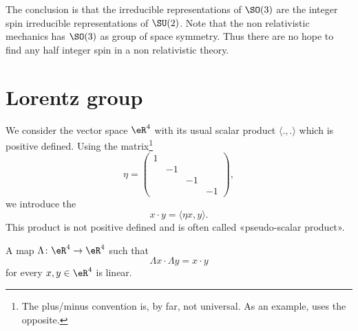 \begin{normaltext}      \label{NORMooHWAYooPlSDOp}
    The conclusion is that the irreducible representations of $\SO(3)$ are the integer spin irreducible representations of $\SU(2)$. Note that the non relativistic mechanics has $\SO(3)$ as group of space symmetry. Thus there are no hope to find any half integer spin in a non relativistic theory.
\end{normaltext}

\section{Lorentz group}

\begin{definition}
    We consider the vector space \( \eR^4\) with its usual scalar product \( \langle ., .\rangle \) which is positive defined. Using the matrix\footnote{The plus/minus convention is, by  far, not universal. As an example, \cite{BIBooYTTJooYpPYLT} uses the opposite.}
    \begin{equation}
        \eta=\begin{pmatrix}
             1   &       &       &       \\
                &   -1    &       &       \\
                &       &   -1    &       \\ 
                &       &       &   -1     
         \end{pmatrix},
    \end{equation}
    we introduce the 
    \begin{equation}    \label{EQooQAXNooXhGUQV}
        x\cdot y=\langle \eta x, y\rangle .
    \end{equation}
    This product is not positive defined and is often called «pseudo-scalar product».
\end{definition}

\begin{lemma}       \label{LEMooICEYooNcjJjD}
    A map \( \Lambda\colon \eR^4\to \eR^4\) such that
    \begin{equation}
        \Lambda x\cdot \Lambda y=x\cdot y
    \end{equation}
    for every \( x,y\in  \eR^4\) is linear.
\end{lemma}

